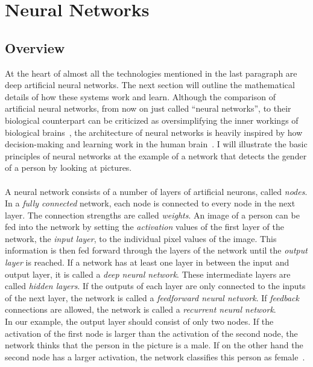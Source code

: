 \section{Neural Networks}
\label{sec:neural-networks}
\subsection{Overview}
\label{subsec:overview}
At the heart of almost all the technologies mentioned in the last paragraph are deep artificial neural networks.
The next section will outline the mathematical details of how these systems work and learn.
Although the comparison of artificial neural networks, from now on just called “neural networks”, to their biological counterpart can be criticized as oversimplifying the inner workings of biological brains~\cite[chapter 1.1]{aggarwal_neural_2018}, the architecture of neural networks is heavily inspired by how decision-making and learning work in the human brain~\cite[chapter 1.1]{aggarwal_neural_2018, mit_nnexplained}.
I will illustrate the basic principles of neural networks at the example of a network that detects the gender of a person by looking at pictures.
\\
\\
A neural network consists of a number of layers of artificial neurons, called \textit{nodes}.
In a \textit{fully connected} network, each node is connected to every node in the next layer.
The connection strengths are called \textit{weights}.
An image of a person can be fed into the network by setting the \textit{activation} values of the first layer of the network, the \textit{input layer}, to the individual pixel values of the image.
This information is then fed forward through the layers of the network until the \textit{output layer} is reached.
If a network has at least one layer in between the input and output layer, it is called a \textit{deep neural network}.
These intermediate layers are called \textit{hidden layers}.
If the outputs of each layer are only connected to the inputs of the next layer, the network is called a \textit{feedforward neural network}.
If \textit{feedback} connections are allowed, the network is called a \textit{recurrent neural network}.
\\
In our example, the output layer should consist of only two nodes.
If the activation of the first node is larger than the activation of the second node, the network thinks that the person in the picture is a male.
If on the other hand the second node has a larger activation, the network classifies this person as female~\cite[chapter 1.2]{aggarwal_neural_2018}.
